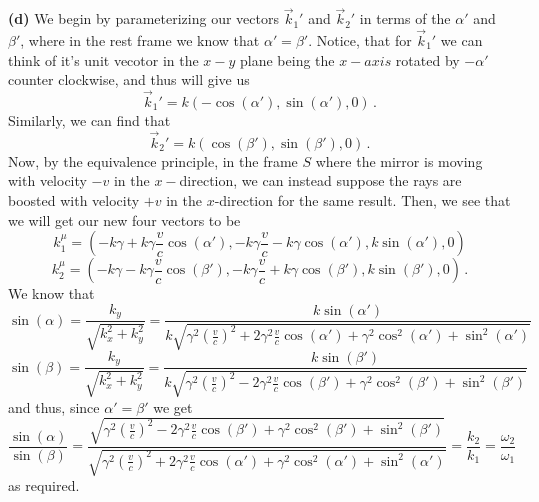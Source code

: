 \documentclass[10pt]{article}
\begin{document}
\textbf{(d)} We begin by parameterizing our vectors $\vec{k}_{1}'$ and $\vec{k}_{2}'$ in terms of the $\alpha'$ and $\beta'$, where in the rest frame we know that $\alpha' = \beta'$. Notice, that for $\vec{k}_{1}'$ we can think of it's unit vecotor in the $x-y$ plane being the $x-axis$ rotated by $-\alpha'$ counter clockwise, and thus will give us
\[ \vec{k}_{1}' = k(-\cos(\alpha'), \sin(\alpha'),0) \, .\]
Similarly, we can find that
\[ \vec{k}_{2}' = k(\cos(\beta'), \sin(\beta'),0) \, .\]
Now, by the equivalence principle, in the frame $S$ where the mirror is moving with velocity $-v$ in the $x-$direction, we can instead suppose the rays are boosted with velocity $+v$ in the $x$-direction for the same result. Then, we see that we will get our new four vectors to be
\[ k_{1}^{\mu} = \left(-k\gamma +k\gamma\frac{v}{c}\cos(\alpha'), -k\gamma\frac{v}{c} - k\gamma\cos(\alpha'), k\sin(\alpha'), 0\right) \]
\[ k_{2}^{\mu} = \left(-k\gamma -k\gamma\frac{v}{c}\cos(\beta'), -k\gamma\frac{v}{c} + k\gamma\cos(\beta'), k\sin(\beta'), 0\right) \, .\]
We know that
\[ \sin(\alpha) = \frac{k_{y}}{\sqrt{k_{x}^{2} + k_{y}^{2}}} = \frac{k\sin(\alpha')}{k\sqrt{\gamma^{2}\left(\frac{v}{c}\right)^{2} + 2\gamma^{2}\frac{v}{c}\cos(\alpha') + \gamma^{2}\cos^{2}(\alpha') + \sin^{2}(\alpha')}} \]
\[ \sin(\beta) = \frac{k_{y}}{\sqrt{k_{x}^{2} + k_{y}^{2}}} = \frac{k\sin(\beta')}{k\sqrt{\gamma^{2}\left(\frac{v}{c}\right)^{2} - 2\gamma^{2}\frac{v}{c}\cos(\beta') + \gamma^{2}\cos^{2}(\beta') + \sin^{2}(\beta')}} \]
and thus, since $\alpha' = \beta'$ we get
\[ \frac{\sin(\alpha)}{\sin(\beta)} = \frac{\sqrt{\gamma^{2}\left(\frac{v}{c}\right)^{2} - 2\gamma^{2}\frac{v}{c}\cos(\beta') + \gamma^{2}\cos^{2}(\beta') + \sin^{2}(\beta')}}{\sqrt{\gamma^{2}\left(\frac{v}{c}\right)^{2} + 2\gamma^{2}\frac{v}{c}\cos(\alpha') + \gamma^{2}\cos^{2}(\alpha') + \sin^{2}(\alpha')}} = \frac{k_{2}}{k_{1}} = \frac{\omega_{2}}{\omega_{1}} \]
as required.
\end{document}
